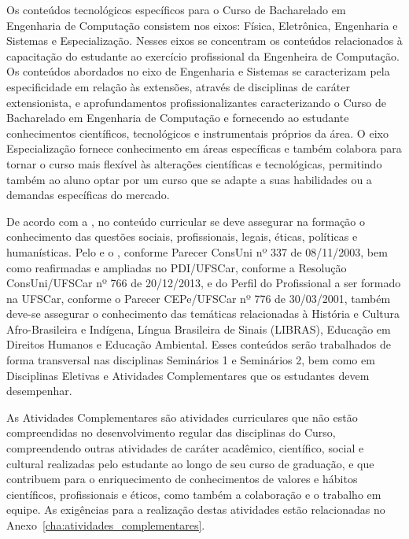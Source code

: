 Os conteúdos tecnológicos específicos para o Curso de Bacharelado em Engenharia de Computação consistem nos eixos: Física, Eletrônica, Engenharia e Sistemas e Especialização. Nesses eixos se concentram os conteúdos relacionados à capacitação do estudante ao exercício profissional da Engenheira de Computação. Os conteúdos abordados no eixo de Engenharia e Sistemas se caracterizam pela especificidade em relação às extensões, através de disciplinas de caráter extensionista, e aprofundamentos profissionalizantes caracterizando o Curso de Bacharelado em Engenharia de Computação e fornecendo ao estudante conhecimentos científicos, tecnológicos e instrumentais próprios da área. O eixo Especialização fornece conhecimento em áreas específicas e também colabora para tornar o curso mais flexível às alterações científicas e tecnológicas, permitindo também ao aluno optar por um curso que se adapte a suas habilidades ou a demandas específicas do mercado.

De acordo com a , no conteúdo curricular se deve assegurar na formação o conhecimento das questões sociais, profissionais, legais, éticas, políticas e humanísticas. Pelo  e o , conforme Parecer ConsUni nº 337 de 08/11/2003, bem como reafirmadas e ampliadas no PDI/UFSCar, conforme a Resolução ConsUni/UFSCar nº 766 de 20/12/2013, e do Perfil do Profissional a ser formado na UFSCar, conforme o Parecer CEPe/UFSCar nº 776 de 30/03/2001, também deve-se assegurar o conhecimento das temáticas relacionadas à História e Cultura Afro-Brasileira e Indígena, Língua Brasileira de Sinais (LIBRAS), Educação em Direitos Humanos e Educação Ambiental.
Esses conteúdos serão trabalhados de forma transversal nas disciplinas Seminários 1 e Seminários 2, bem como em Disciplinas Eletivas e Atividades Complementares que os estudantes devem desempenhar. %

As Atividades Complementares são atividades curriculares que não estão compreendidas no desenvolvimento regular das disciplinas do Curso, compreendendo
outras atividades de caráter acadêmico, científico, social e cultural realizadas pelo estudante ao longo de seu curso de graduação, e que contribuem para o enriquecimento de conhecimentos de valores e hábitos científicos, profissionais e éticos, como também a colaboração e o trabalho em equipe. As exigências para a realização destas atividades estão relacionadas no Anexo~\ref{cha:atividades_complementares}.

